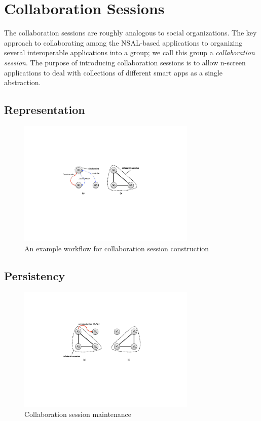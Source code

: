 \documentclass{sig-alternate}
\begin{document}
\section{Collaboration Sessions}
The collaboration sessions are roughly analogous to social organizations.
The key approach to collaborating among the NSAL-based applications to organizing several interoperable applications into a group; we call this group a \textit{collaboration session}.
The purpose of introducing collaboration sessions is to allow n-screen applications to deal with collections of different smart apps as a single abstraction.

\subsection{Representation}

    \begin{figure}[htb] %
    \centering
    \includegraphics[width=8.5cm,keepaspectratio]{constructsession}
    \caption{An example workflow for collaboration session construction}
    \label{fig:constructsession}
    \end{figure}

\subsection{Persistency}

    \begin{figure}[htb] %
    \centering
    \includegraphics[width=8.5cm,keepaspectratio]{pushmigration}
    \caption{Collaboration session maintenance}
    \label{fig:pushmigration}
    \end{figure}
\end{document}

